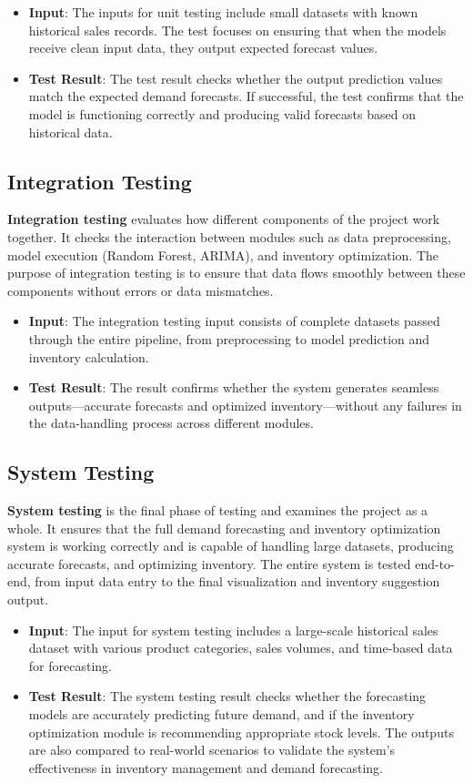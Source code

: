 \documentclass[10pt]{report}
\begin{document}
\begin{center}
\begin{itemize}
    \item \textbf{Input}: The inputs for unit testing include small datasets with known historical sales records. The test focuses on ensuring that when the models receive clean input data, they output expected forecast values.
    \item \textbf{Test Result}: The test result checks whether the output prediction values match the expected demand forecasts. If successful, the test confirms that the model is functioning correctly and producing valid forecasts based on historical data.
\end{itemize}

\subsection{Integration Testing}
\textbf{Integration testing} evaluates how different components of the project work together. It checks the interaction between modules such as data preprocessing, model execution (Random Forest, ARIMA), and inventory optimization. The purpose of integration testing is to ensure that data flows smoothly between these components without errors or data mismatches.

\begin{itemize}
    \item \textbf{Input}: The integration testing input consists of complete datasets passed through the entire pipeline, from preprocessing to model prediction and inventory calculation.
    \item \textbf{Test Result}: The result confirms whether the system generates seamless outputs—accurate forecasts and optimized inventory—without any failures in the data-handling process across different modules.
\end{itemize}

\subsection{System Testing}
\textbf{System testing} is the final phase of testing and examines the project as a whole. It ensures that the full demand forecasting and inventory optimization system is working correctly and is capable of handling large datasets, producing accurate forecasts, and optimizing inventory. The entire system is tested end-to-end, from input data entry to the final visualization and inventory suggestion output.

\begin{itemize}
    \item \textbf{Input}: The input for system testing includes a large-scale historical sales dataset with various product categories, sales volumes, and time-based data for forecasting.
    \item \textbf{Test Result}: The system testing result checks whether the forecasting models are accurately predicting future demand, and if the inventory optimization module is recommending appropriate stock levels. The outputs are also compared to real-world scenarios to validate the system's effectiveness in inventory management and demand forecasting.
\end{itemize}

\end{center}
\end{document}
